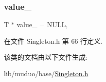 \mbox{\label{classmuduo_1_1Singleton_a4ddc1e6e173732d80915527e28056b48}} 
\subsubsection{\texorpdfstring{value\+\_\+}{value\_}}
{\footnotesize\ttfamily T $\ast$ value\+\_\+ = N\+U\+LL\hspace{0.3cm}{\ttfamily [static]}, {\ttfamily [private]}}



在文件 Singleton.\+h 第 66 行定义.



该类的文档由以下文件生成\+:\begin{DoxyCompactItemize}
\item 
lib/muduo/base/\hyperlink{Singleton_8h}{Singleton.\+h}\end{DoxyCompactItemize}
